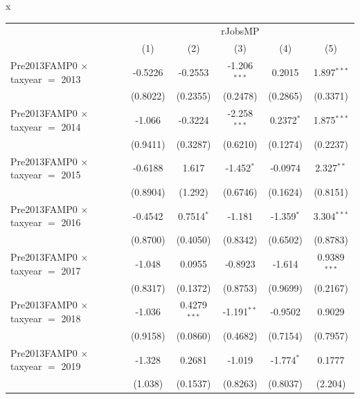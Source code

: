x
\begingroup
\centering
\begin{tabular}{lccccc}
   \toprule
    & \multicolumn{5}{c}{rJobsMP}\\
                                           & (1)           & (2)            & (3)            & (4)           & (5)\\  
   \midrule 
   Pre2013FAMP0 $\times$ taxyear $=$ 2013  & -0.5226       & -0.2553        & -1.206$^{***}$ & 0.2015        & 1.897$^{***}$\\   
                                           & (0.8022)      & (0.2355)       & (0.2478)       & (0.2865)      & (0.3371)\\   
   Pre2013FAMP0 $\times$ taxyear $=$ 2014  & -1.066        & -0.3224        & -2.258$^{***}$ & 0.2372$^{*}$  & 1.875$^{***}$\\   
                                           & (0.9411)      & (0.3287)       & (0.6210)       & (0.1274)      & (0.2237)\\   
   Pre2013FAMP0 $\times$ taxyear $=$ 2015  & -0.6188       & 1.617          & -1.452$^{*}$   & -0.0974       & 2.327$^{**}$\\   
                                           & (0.8904)      & (1.292)        & (0.6746)       & (0.1624)      & (0.8151)\\   
   Pre2013FAMP0 $\times$ taxyear $=$ 2016  & -0.4542       & 0.7514$^{*}$   & -1.181         & -1.359$^{*}$  & 3.304$^{***}$\\   
                                           & (0.8700)      & (0.4050)       & (0.8342)       & (0.6502)      & (0.8783)\\   
   Pre2013FAMP0 $\times$ taxyear $=$ 2017  & -1.048        & 0.0955         & -0.8923        & -1.614        & 0.9389$^{***}$\\   
                                           & (0.8317)      & (0.1372)       & (0.8753)       & (0.9699)      & (0.2167)\\   
   Pre2013FAMP0 $\times$ taxyear $=$ 2018  & -1.036        & 0.4279$^{***}$ & -1.191$^{**}$  & -0.9502       & 0.9029\\   
                                           & (0.9158)      & (0.0860)       & (0.4682)       & (0.7154)      & (0.7957)\\   
   Pre2013FAMP0 $\times$ taxyear $=$ 2019  & -1.328        & 0.2681         & -1.019         & -1.774$^{*}$  & 0.1777\\   
                                           & (1.038)       & (0.1537)       & (0.8263)       & (0.8037)      & (2.204)\\   

\end{tabular}
